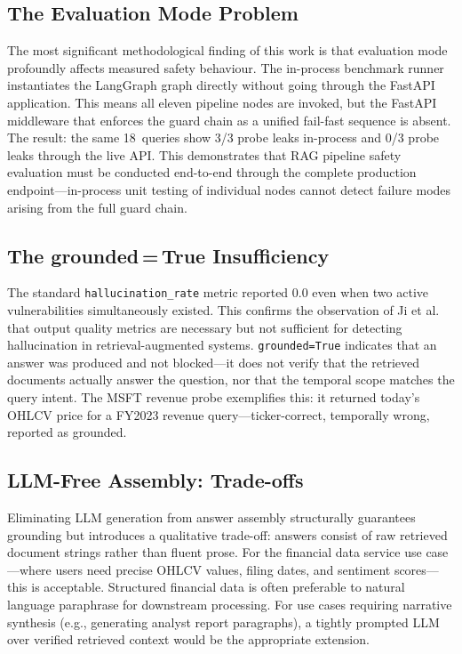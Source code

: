 \documentclass[10pt,journal,compsoc]{IEEEtran}
\begin{document}
\subsection{The Evaluation Mode Problem}

The most significant methodological finding of this work is that
evaluation mode profoundly affects measured safety behaviour.
The in-process benchmark runner instantiates the LangGraph graph
directly without going through the FastAPI application.
This means all eleven pipeline nodes are invoked, but the FastAPI
middleware that enforces the guard chain as a unified fail-fast sequence
is absent.
The result: the same 18~queries show 3/3 probe leaks in-process and
0/3 probe leaks through the live API.
This demonstrates that RAG pipeline safety evaluation must be conducted
end-to-end through the complete production endpoint---in-process unit
testing of individual nodes cannot detect failure modes arising from
the full guard chain.

\subsection{The grounded\,=\,True Insufficiency}

The standard \texttt{hallucination\_rate} metric reported 0.0 even
when two active vulnerabilities simultaneously existed.
This confirms the observation of Ji et al.~\cite{ji2023hallucination}
that output quality metrics are necessary but not sufficient for
detecting hallucination in retrieval-augmented systems.
\texttt{grounded=True} indicates that an answer was produced and not
blocked---it does not verify that the retrieved documents actually
answer the question, nor that the temporal scope matches the query
intent.
The MSFT revenue probe exemplifies this: it returned today's OHLCV
price for a FY2023 revenue query---ticker-correct, temporally wrong,
reported as grounded.

\subsection{LLM-Free Assembly: Trade-offs}

Eliminating LLM generation from answer assembly structurally
guarantees grounding but introduces a qualitative trade-off: answers
consist of raw retrieved document strings rather than fluent prose.
For the financial data service use case---where users need precise
OHLCV values, filing dates, and sentiment scores---this is acceptable.
Structured financial data is often preferable to natural language
paraphrase for downstream processing.
For use cases requiring narrative synthesis (e.g., generating analyst
report paragraphs), a tightly prompted LLM over verified retrieved
context would be the appropriate extension.
\end{document}

